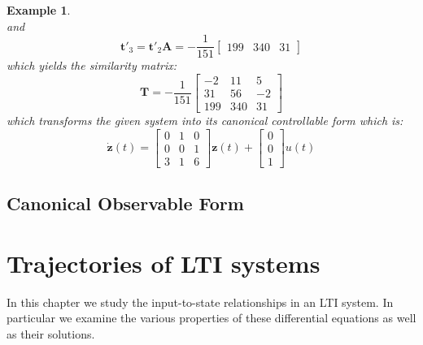 \documentclass[a4paper,10pt,oneside]{book}
\newtheorem{example}{Example}
\begin{document}
\begin{example}
\begin{equation}
\end{equation}
and
\begin{equation}
 \mathbf{t}'_3=\mathbf{t}'_2\mathbf{A}=-\frac{1}{151}\left[ {\begin{array}{ccc} 199 & 340 & 31 \end{array} } \right]
\end{equation}
which yields the similarity matrix:
\begin{equation}
\mathbf{T}=-\frac{1}{151}\left[ {\begin{array}{ccc}
 -2 & 11 & 5  \\
 31 & 56 & -2  \\
 199 & 340 & 31
 \end{array} } \right]
\end{equation}
which transforms the given system into its canonical controllable form which is:
\begin{equation}
 \dot{\mathbf{z}}(t)=\left[ {\begin{array}{ccc}
 0 & 1 & 0  \\
 0 & 0 & 1  \\
 3 & 1 & 6
 \end{array} } \right]
\mathbf{z}(t)+ 
\left[ {\begin{array}{c}
 0  \\
 0  \\
 1 
 \end{array} } \right]
u(t)
\end{equation}
\end{example}

\section{Canonical Observable Form}


\chapter{Trajectories of LTI systems}
In this chapter we study the input-to-state relationships in an LTI system. In particular we examine the various properties of these differential equations as well as their solutions.
\end{document}
